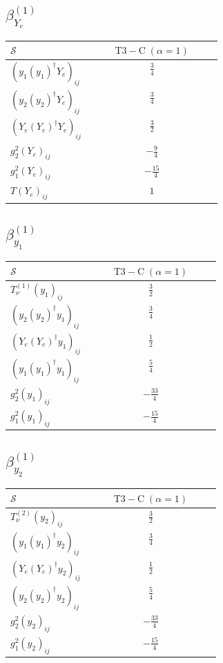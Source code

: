 \documentclass[9pt]{article}
\begin{document}
\subsection*{$ \beta_{Y_e}^{(1)} $}
\begin{longtable}{@{}p{0.38\linewidth}c@{}}
\toprule
$\mathcal{S}$ & $ \mathrm{T3-C}\;(\alpha=1) $ \\
\midrule
$ (y_1 (y_1)^{\dagger} Y_e)_{ij} $ & $ \frac{3}{4} $ \\
$ (y_2 (y_2)^{\dagger} Y_e)_{ij} $ & $ \frac{3}{4} $ \\
$ (Y_e (Y_e)^{\dagger} Y_e)_{ij} $ & $ \frac{3}{2} $ \\
$ g_2^2 (Y_e)_{ij} $ & $ - \frac{9}{4} $ \\
$ g_1^2 (Y_e)_{ij} $ & $ - \frac{15}{4} $ \\
$ T (Y_e)_{ij} $ & $ 1 $ \\
\bottomrule
\end{longtable}
\subsection*{$ \beta_{y_1}^{(1)} $}
\begin{longtable}{@{}p{0.38\linewidth}c@{}}
\toprule
$\mathcal{S}$ & $ \mathrm{T3-C}\;(\alpha=1) $ \\
\midrule
$ T_{\nu}^{(1)} (y_1)_{ij} $ & $ \frac{3}{2} $ \\
$ (y_2 (y_2)^{\dagger} y_1)_{ij} $ & $ \frac{3}{4} $ \\
$ (Y_e (Y_e)^{\dagger} y_1)_{ij} $ & $ \frac{1}{2} $ \\
$ (y_1 (y_1)^{\dagger} y_1)_{ij} $ & $ \frac{5}{4} $ \\
$ g_2^2 (y_1)_{ij} $ & $ - \frac{33}{4} $ \\
$ g_1^2 (y_1)_{ij} $ & $ - \frac{15}{4} $ \\
\bottomrule
\end{longtable}
\subsection*{$ \beta_{y_2}^{(1)} $}
\begin{longtable}{@{}p{0.38\linewidth}c@{}}
\toprule
$\mathcal{S}$ & $ \mathrm{T3-C}\;(\alpha=1) $ \\
\midrule
$ T_{\nu}^{(2)} (y_2)_{ij} $ & $ \frac{3}{2} $ \\
$ (y_1 (y_1)^{\dagger} y_2)_{ij} $ & $ \frac{3}{4} $ \\
$ (Y_e (Y_e)^{\dagger} y_2)_{ij} $ & $ \frac{1}{2} $ \\
$ (y_2 (y_2)^{\dagger} y_2)_{ij} $ & $ \frac{5}{4} $ \\
$ g_2^2 (y_2)_{ij} $ & $ - \frac{33}{4} $ \\
$ g_1^2 (y_2)_{ij} $ & $ - \frac{15}{4} $ \\
\bottomrule
\end{longtable}
\end{document}

